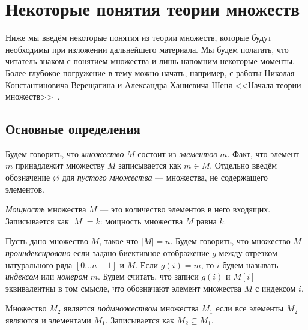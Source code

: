 \setchapterpreamble[u]{\margintoc}
\chapter{Некоторые понятия теории множеств}

Ниже мы введём некоторые понятия из теории множеств, которые будут необходимы при изложении дальнейшего материала.
Мы будем полагать, что читатель знаком с понятием множества и лишь напомним некоторые моменты.
Более глубокое погружение в тему можно начать, например, с работы Николая Константиновича Верещагина и Александра Ханиевича Шеня <<Начала теории множеств>>~.

\section{Основные определения}

Будем говорить, что \emph{множество} $M$ состоит из \emph{элементов} $m$.
Факт, что элемент $m$ принадлежит множеству $M$ записывается как $m \in M$.
Отдельно введём обозначение $\varnothing$ для \emph{пустого множества} --- множества, не содержащего элементов.

\begin{definition}
    \emph{Мощность} множества $M$ --- это количество элементов в него входящих.
    Записывается как $|M| = k$: мощность множества $M$ равна $k$.
\end{definition}

\begin{definition}
    Пусть дано множество $M$, такое что $|M| = n$.
    Будем говорить, что множество $M$ \emph{проиндексировано} если задано биективное отображение $g$ между отрезком натурального ряда $[0 \ldots n-1]$ и $M$.
    Если $g(i) = m$, то $i$ будем называть \emph{индексом} или \emph{номером} $m$.
    Будем считать, что записи  $g(i)$ и $M[i]$ эквивалентны в том смысле, что обозначают элемент множества $M$ с индексом $i$.
\end{definition}

\begin{definition}[Подмножество]
    Множество $M_2$ является \emph{подмножеством} множества $M_1$ если все элементы $M_2$ являются и элементами $M_1$.
    Записывается как $M_2 \subseteq M_1$.
\end{definition}

